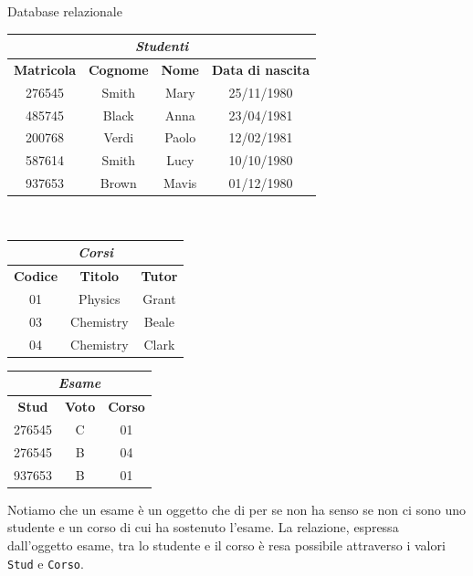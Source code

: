 \begin{Example}{Database relazionale}{}
    
    \begin{center}
        \begin{tabular}{|c|c|c|c|}
            \hline\multicolumn{4}{|c|}{\textit{Studenti}}\\\hline
             \textbf{Matricola} & \textbf{Cognome} & \textbf{Nome} & \textbf{Data di nascita}\\\hline
            276545 & Smith & Mary & 25/11/1980\\
            485745 & Black & Anna & 23/04/1981\\
            200768 & Verdi & Paolo & 12/02/1981\\
            587614 & Smith & Lucy & 10/10/1980\\
            937653 & Brown & Mavis & 01/12/1980\\\hline
        \end{tabular}\\
        \begin{tabular}{|c|c|c|}
            \hline\multicolumn{3}{|c|}{\textit{Corsi}}\\\hline
            \textbf{Codice} & \textbf{Titolo} & \textbf{Tutor}\\\hline
            01 & Physics & Grant\\
            03 & Chemistry & Beale\\
            04 & Chemistry & Clark\\\hline
        \end{tabular}
        \begin{tabular}{|c|c|c|}
            \hline\multicolumn{3}{|c|}{\textit{Esame}}\\\hline
            \textbf{Stud} & \textbf{Voto} & \textbf{Corso}\\\hline
            276545 & C & 01\\
            276545 & B & 04\\
            937653 & B & 01\\\hline
        \end{tabular}
        \bigskip
    \end{center}
    
    Notiamo che un esame è un oggetto che di per se non ha senso se non ci sono uno studente e un corso di cui ha sostenuto l'esame. La relazione, espressa dall'oggetto esame, tra lo studente e il corso è resa possibile attraverso i valori \verb|Stud| e \verb|Corso|.
\end{Example}

